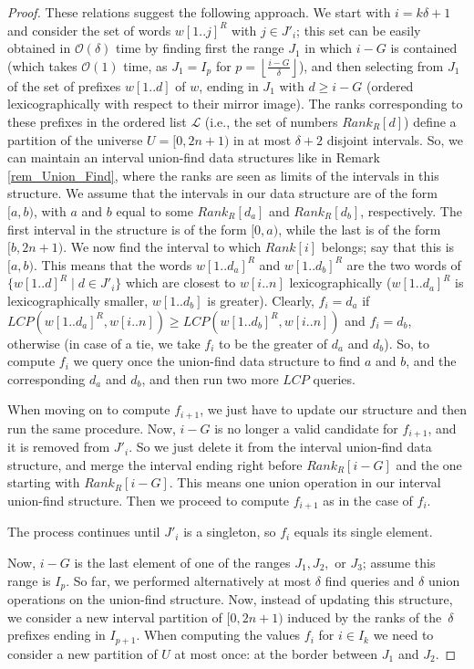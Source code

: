 \documentclass[final]{dmtcs-episciences}
\newcommand{\bigo}{{\mathcal O}}
\newcommand{\LCP}{{\mathit{LCP}}}
\begin{document}
\begin{proof}
These relations suggest the following approach. We start with $i=k\delta+1$ and consider the set of words $w[1..j]^R$ with $j\in J'_i$; this set can be easily obtained in $\bigo(\delta)$ time by finding first the range $J_1$ in which $i-G$ is contained (which takes $\bigo(1)$ time, as $J_1=I_p$ for $p=\left\lfloor\frac{i-G}{\delta}\right\rfloor$), and then selecting from $J_1$ of the set of prefixes $w[1..d]$ of $w$, ending in $J_1$ with $d\geq i-G$ (ordered lexicographically with respect to their mirror image). The ranks corresponding to these prefixes in the ordered list ${\mathcal L}$ (i.e., the set of numbers $Rank_R[d]$) define a partition of the universe $U=[0,2n+1)$ in at most $\delta+2$ disjoint intervals. So, we can maintain an interval union-find data structures like in Remark \ref{rem_Union_Find}, where the ranks are seen as limits of the intervals in this structure. We assume that the intervals in our data structure are of the form $[a,b)$, with $a$ and $b$ equal to some $Rank_R[d_a]$ and $Rank_R[d_b]$, respectively. The first interval in the structure is of the form $[0,a)$, while the last is of the form $[b,2n+1)$. We now find the interval to which $Rank[i]$ belongs; say that this is $[a,b)$. This means that the words $w[1..d_a]^R$ and $w[1..d_b]^R$ are the two words of $\{w[1..d]^R\mid d\in J'_i\}$ which are closest to $w[i..n]$ lexicographically ($w[1..d_a]^R$ is lexicographically smaller, $w[1..d_b]$ is greater). Clearly, $f_i=d_a$ if $\LCP(w[1..d_a]^R,w[i..n])\geq \LCP(w[1..d_b]^R,w[i..n])$ and $f_i=d_b$, otherwise (in case of a tie, we take $f_i$ to be the greater of $d_a$ and $d_b$). So, to compute $f_i$ we query once the union-find data structure to find $a$ and $b$, and the corresponding $d_a$ and $d_b$, and then run two more $\LCP$ queries. 

When moving on to compute $f_{i+1}$, we just have to update our structure and then run the same procedure. Now, $i-G$ is no longer a valid candidate for $f_{i+1}$, and it is removed from $J'_i$. So we just delete it from the interval union-find data structure, and merge the interval ending right before $Rank_R[i-G]$ and the one starting with $Rank_R[i-G]$. This means one union operation in our interval union-find structure. Then we proceed to compute $f_{i+1}$ as in the case of $f_i$.

The process continues until $J'_i$ is a singleton, so $f_i$ equals its single element.

Now, $i-G$ is the last element of one of the ranges $J_1,J_2,$ or $J_3$; assume this range is $I_p$. So far, we performed alternatively at most $\delta$ find queries and $\delta$ union operations on the union-find structure. Now,  instead of updating this structure, we consider a new interval partition of $[0,2n+1)$ induced by the ranks of the~$\delta$ prefixes ending in $I_{p+1}$. When computing the values $f_i$ for $i\in I_k$ we need to consider a new partition of $U$ at most once: at the border between $J_1$ and $J_2$.


\end{proof}
\end{document}

